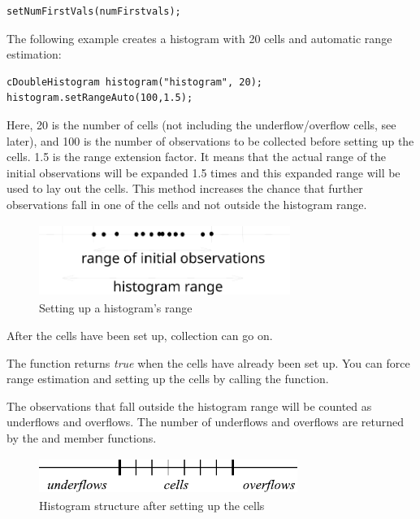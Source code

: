 \begin{verbatim}
setNumFirstVals(numFirstvals);
\end{verbatim}

The following example creates a histogram with 20 cells and automatic
range estimation:

\begin{verbatim}
cDoubleHistogram histogram("histogram", 20);
histogram.setRangeAuto(100,1.5);
\end{verbatim}


Here, 20 is the number of cells (not including the underflow/overflow
cells, see later), and 100 is the number of observations to be
collected before setting up the cells. 1.5 is the range extension
factor. It means that the actual range of the initial observations
will be expanded 1.5 times and this expanded range will be used to lay
out the cells. This method increases the chance that further
observations fall in one of the cells and not outside the histogram
range.

\begin{figure}[htbp]
  \begin{center}
    \includegraphics[width=3.215in, height=0.930in]{figures/histogramrange}
    \caption{Setting up a histogram's range}
  \end{center}
\end{figure}

After the cells have been set up, collection can go on.

The  function returns \textit{true} when the cells have
already been set up. You can force range estimation and setting
up the cells by calling the  function.

The observations that fall outside the histogram range will be counted
as underflows and overflows. The number of underflows and overflows
are returned by the  and 
member functions.

\begin{figure}[htbp]
\begin{center}
  \includegraphics[width=3.310in, height=0.467in]{figures/usmanFig13}
  \caption{Histogram structure after setting up the cells}
\end{center}
\end{figure}

